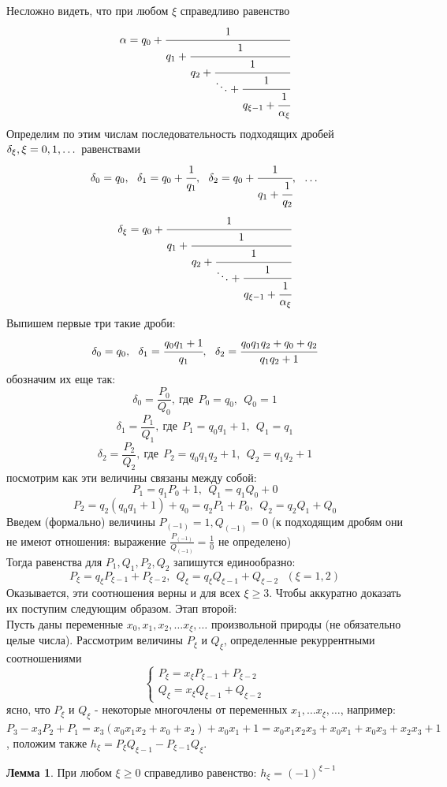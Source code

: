 \documentclass[a4paper, 12pt]{article}
\theoremstyle{definition}
\newtheorem{lemma}{Лемма}[section]
\begin{document}
    Несложно видеть, что при любом $\xi$ справедливо равенство \[\alpha=q_0+\cfrac{1}{q_1+\cfrac{1}{q_2+\cfrac{1}{\ddots+\cfrac{1}{q_{\xi-1}+\cfrac{1}{\alpha_{\xi}}}}}}\]
    Определим по этим числам последовательность подходящих дробей $\delta_{\xi},\\
    \xi=0,1,\dots$ равенствами
    \[\delta_0=q_0,\ \ \delta_1=q_0+\cfrac{1}{q_1},\ \ \delta_2=q_0+\cfrac{1}{q_1+\cfrac{1}{q_2}},\ \ \dots\]
    \[\delta_{\xi}=q_0+\cfrac{1}{q_1+\cfrac{1}{q_2+\cfrac{1}{\ddots+\cfrac{1}{q_{\xi-1}+\cfrac{1}{\alpha_{\xi}}}}}}\]
    Выпишем первые три такие дроби:
    \[\delta_0=q_0,\ \ \delta_1=\cfrac{q_0 q_1+1}{q_1},\ \ \delta_2=\cfrac{q_0 q_1 q_2+q_0+q_2}{q_1 q_2+1}\]
    обозначим их еще так:
    \[\delta_0=\frac{P_0}{Q_0},\ \text{где}\ \ P_0=q_0,\ \ Q_0=1\]
    \[\delta_1=\frac{P_1}{Q_1},\ \text{где}\ \ P_1=q_0 q_1+1,\ \ Q_1=q_1\]
    \[\delta_2=\frac{P_2}{Q_2},\ \text{где}\ \ P_2=q_0 q_1 q_2+1,\ \ Q_2=q_1 q_2+1\]
    посмотрим как эти величины связаны между собой:
    \[P_1=q_1 P_0+1,\ \ Q_1=q_1 Q_0+0\]
    \[P_2=q_2 (q_0q_1+1)+q_0=q_2 P_1+P_0,\ \ Q_2=q_2 Q_1+Q_0\]
    Введем (формально) величины $P_{(-1)}=1, Q_{(-1)}=0$ (к подходящим дробям они не имеют отношения: выражение $\frac{P_{(-1)}}{Q_{(-1)}}=\frac{1}{0}$ не определено)\\
    Тогда равенства для $P_1, Q_1, P_2, Q_2$ запишутся единообразно:
    \[P_{\xi}=q_{\xi}P_{\xi-1}+P_{\xi-2},\ \ Q_{\xi}=q_{\xi}Q_{\xi-1}+Q_{\xi-2}\ \ \ (\xi=1,2)\]
    Оказывается, эти соотношения верны и для всех $\xi\geq 3$. Чтобы аккуратно доказать их поступим следующим образом.
    Этап второй:\\
    Пусть даны переменные $x_0, x_1, x_2,\dots x_{\xi}, \dots$ произвольной природы (не обязательно целые числа). Рассмотрим величины $P_{\xi}$ и $Q_{\xi}$, определенные рекуррентными соотношениями
    \begin{equation} \label{equation3}
        \begin{cases}
            P_{\xi}=x_{\xi} P_{\xi-1}+P_{\xi-2}\\
            Q_{\xi}=x_{\xi} Q_{\xi-1}+Q_{\xi-2}
        \end{cases}
    \end{equation}
    ясно, что $P_{\xi}$ и $Q_{\xi}$ - некоторые многочлены от переменных $x_1,\dots x_{\xi},\dots$, например: $P_3-x_3P_2+P_1=x_3(x_0x_1x_2+x_0+x_2)+x_0x_1+1=x_0x_1x_2x_3+x_0x_1+x_0x_3+x_2x_3+1$, положим также $h_{\xi}=P_{\xi}Q_{\xi-1}-P_{\xi-1}Q_{\xi}$.
    \begin{lemma}\label{lemma7.1}
        При любом $\xi\geq 0$ справедливо равенство: $h_{\xi}=(-1)^{\xi-1}$
    \end{lemma} 
\end{document}
